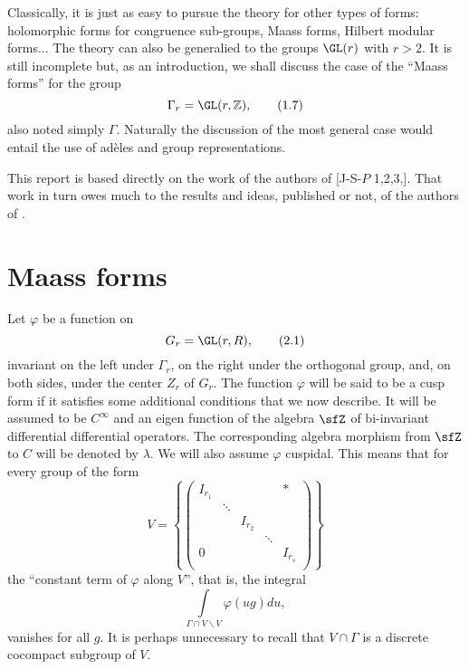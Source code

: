 Classically, it is just as easy to pursue the theory for other types of forms: holomorphic forms for congruence sub-groups, Maass forms, Hilbert modular forms... The theory can also be generalied to the groups $\GL(r)$ with $r>2$. It is still incomplete but, as an introduction, we shall discuss the case of the ``Maass forms'' for the group
\begin{equation*}
\Gamma_{r}=\GL(r,\mathbb{Z}),\tag{1.7}\label{art5-eq1.7}
\end{equation*}
also noted simply $\Gamma$. Naturally the discussion of the most general case would entail the use of ad\`eles and group representations.

This report is based directly on the work of the authors of [J-S-$P$ 1,2,3,]. That work in turn owes much to the results and ideas, published or not, of the authors of \cite{art5-G-K}.

\section{Maass forms}\label{art5-sec2}
Let $\varphi$ be a function on
\begin{equation*}
G_{r}=\GL(r,R),\tag{2.1}\label{art5-eq2.1}
\end{equation*}
invariant on the left under $\Gamma_{r}$, on the right under the orthogonal group, and, on both sides, under the center $Z_{r}$ of $G_{r}$. The function $\varphi$ will be said to be a cusp form if it satisfies some additional conditions that we now describe. It will be assumed to be $C^{\infty}$ and an eigen function of the algebra $\sfZ$ of bi-invariant differential differential operators. The corresponding algebra morphism from $\sfZ$ to $C$ will be denoted by $\lambda$. We will also assume $\varphi$ cuspidal. This means that for every group of the form
\begin{equation*}
V=
\left\{
\left(
\begin{matrix}
I_{r_{1}} & & & & \ast \\
  & \ddots & & & \\
  &  & I_{r_{2}} & & \\
  &  & & \ddots &\\
0  & & & & I_{r_{s}}\\
\end{matrix}
\right)
\right\}\tag{2.2}\label{art5-eq2.2}
\end{equation*}
the ``constant term of $\varphi$ along $V$'', that is, the integral
\begin{equation*}
\int\limits_{\Gamma\cap V\backslash V}\varphi(ug)du,\tag{2.3}\label{art5-eq2.3}
\end{equation*}
vanishes for all $g$. It is perhaps unnecessary to recall that $V\cap \Gamma$ is a discrete cocompact subgroup of $V$.

